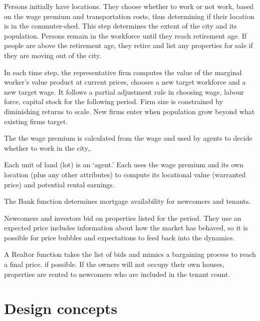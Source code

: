 Persons initially have locations. They choose whether to work or not work, based on the wage premium and transportation costs, thus determining if their location is in the commuter-shed. This step determines the extent of the city and its population. Persons remain in the workforce until they reach retirement age. If people are above the retirement age, they retire and list any properties for sale if they are moving out of the city. 



In each time step, the representative firm computes the value of the marginal worker's value product at current prices, chooses a new target workforce and a new target wage. It follows a partial adjustment rule in choosing wage, labour force, capital stock for the following period. Firm size is constrained by diminishing returns to scale. New firms enter when population grow beyond what existing firms target. 


The the wage premium is calculated from the wage  and used by agents to decide whether to work in the city,.

Each unit of land (lot) is an `agent.' Each uses the wage premium and its own location (plus any other attributes) to compute its locational value (warranted price) and potential rental earnings. 

The Bank function determines mortgage availability for newcomers and tenants. 

Newcomers and investors bid on properties listed for the period. They use an expected price includes information about how the market has behaved, so it is possible for price bubbles and expectations to feed back into the dynamics. 

A Realtor function takes the list of bids and mimics a bargaining process to reach a final price. if possible. If the owners will not occupy their own houses, properties are rented to newcomers who are included in the tenant count.





\section{Design concepts}

